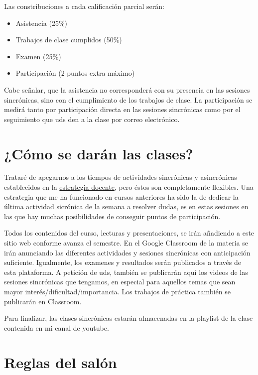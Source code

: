 \documentclass[
]{book}
\providecommand{\tightlist}{%
  \setlength{\itemsep}{0pt}\setlength{\parskip}{0pt}}
\begin{document}
Las constribuciones a cada calificación parcial serán:

\begin{itemize}
\tightlist
\item
  Asistencia (25\%)
\item
  Trabajos de clase cumplidos (50\%)
\item
  Examen (25\%)
\item
  Participación (2 puntos extra máximo)
\end{itemize}

Cabe señalar, que la asistencia no corresponderá con su presencia en las sesiones sincrónicas, sino con el cumplimiento de los trabajos de clase. La participación se medirá tanto por participación directa en las sesiones sincrónicas como por el seguimiento que uds den a la clase por correo electrónico.

\hypertarget{cuxf3mo-se-daruxe1n-las-clases}{%
\section{¿Cómo se darán las clases?}\label{cuxf3mo-se-daruxe1n-las-clases}}

Trataré de apegarnos a los tiempos de actividades sincrónicas y asincrónicas establecidos en la \href{Estrategia-docente.pdf}{estrategia docente}, pero éstos son completamente flexibles. Una estrategia que me ha funcionado en cursos anteriores ha sido la de dedicar la última actividad sicrónica de la semana a resolver dudas, es en estas sesiones en las que hay muchas posibilidades de conseguir puntos de participación.

Todos los contenidos del curso, lecturas y presentaciones, se irán añadiendo a este sitio web conforme avanza el semestre. En el Google Classroom de la materia se irán anunciando las diferentes actividades y sesiones sincrónicas con anticipación suficiente. Igualmente, los examenes y resultados serán publicados a través de esta plataforma. A petición de uds, también se publicarán aquí los videos de las sesiones sincrónicas que tengamos, en especial para aquellos temas que sean mayor interés/dificultad/importancia. Los trabajos de práctica también se publicarán en Classroom.

Para finalizar, las clases sincrónicas estarán almacenadas en la playlist de la clase contenida en mi canal de youtube.

\hypertarget{reglas-del-saluxf3n}{%
\section{Reglas del salón}\label{reglas-del-saluxf3n}}
\end{document}
